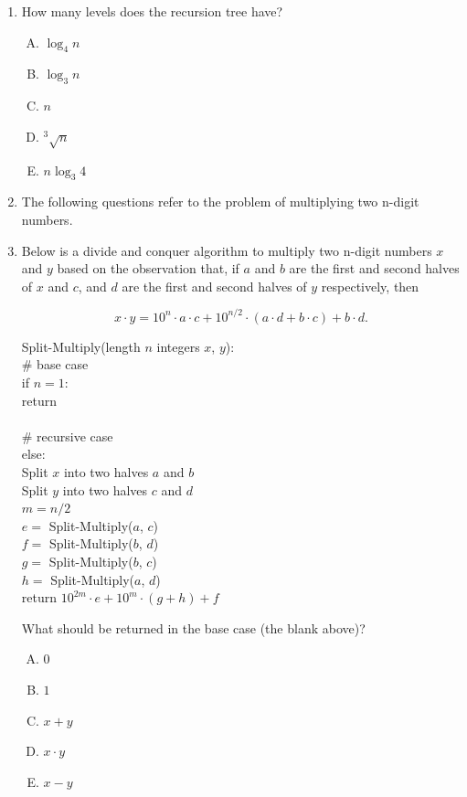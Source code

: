 \documentclass[11pt]{article}
\begin{document}
\begin{enumerate}
\item How many levels does the recursion tree have?

\begin{enumerate}[A.]
    \item $\log_4 n$
    \item $\log_3 n$
    \item $n$
    \item $^3\sqrt{n}$
    \item $n \log_3 4$

\end{enumerate}

\item[]

The following questions refer to the problem of multiplying two n-digit
numbers.

\item Below is a divide and conquer algorithm to multiply two n-digit numbers $x$
and $y$ based on the observation that, if $a$ and $b$ are the first and second halves
of $x$ and $c$, and $d$ are the first and second halves of $y$ respectively, then

\[
x \cdot y = 10^n \cdot a \cdot c + 10^{n/2} \cdot (a \cdot d + b \cdot c) + b \cdot d.
\]

    \begin{algo}
    Split-Multiply(length $n$ integers $x$, $y$):\+\\
    \# base case\\
    if $n = 1$:\+\\
        return \underline{\hspace{1in}}\- \\
    \\
    \# recursive case\\
    else:\+\\
    Split $x$ into two halves $a$ and $b$\\
    Split $y$ into two halves $c$ and $d$\\
    $m=n/2$\\
    $e = $ Split-Multiply($a$, $c$) \\
    $f = $ Split-Multiply($b$, $d$) \\
    $g = $ Split-Multiply($b$, $c$) \\
    $h = $ Split-Multiply($a$, $d$) \\
    return $10^{2m} \cdot e + 10^{m} \cdot (g + h) + f$
    \end{algo} 

What should be returned in the base case (the blank above)?
\begin{enumerate}[A.]
    \item $0$
    \item $1$
    \item $x + y$
    \item $x \cdot y$
    \item $x - y$
\end{enumerate}


\end{enumerate}
\end{document}
